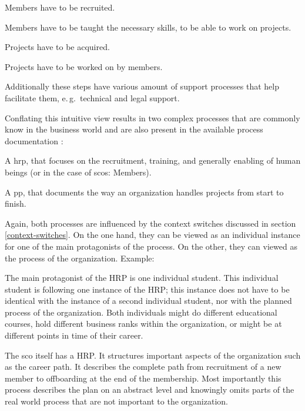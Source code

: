 \documentclass[a4paper, DIV=13, BCOR=0cm]{scrbook}
\newcommand{\eg}{e.\,g.\ }
\begin{document}
\begin{compactitem}
	\item Members have to be recruited.
	\item Members have to be taught the necessary skills, to be able to work on projects.
	\item Projects have to be acquired.
	\item Projects have to be worked on by members.
\end{compactitem}

Additionally these steps have various amount of support processes that help facilitate them, \eg technical and legal support.

Conflating this intuitive view results in two complex processes that are commonly know in the business world \cite{CN} and are also present in the available process documentation \cite{HCPD}:
\begin{compactenum}
	\item A \gls{hrp}, that focuses on the recruitment, training, and generally enabling of human beings (or in the case of \glspl{sco}: Members).
	\item A \gls{pp}, that documents the way an organization handles projects from start to finish.
\end{compactenum}

Again, both processes are influenced by the context switches discussed in section \ref{context-switches}. On the one hand, they can be viewed as an individual instance for one of the main protagonists of the process. On the other, they can viewed as the process of the organization. Example:
\begin{compactitem}
	\item The main protagonist of the HRP is one individual student. This individual student is following one instance of the HRP; this instance does not have to be identical with the instance of a second individual student, nor with the planned process of the organization. Both individuals might do different educational courses, hold different business ranks within the organization, or might be at different points in time of their career.
	\item The \gls{sco} itself has a HRP. It structures important aspects of the organization such as the career path. It describes the complete path from recruitment of a new member to offboarding at the end of the membership. Most importantly this process describes the plan on an abstract level and knowingly omits parts of the real world process that are not important to the organization.
\end{compactitem}
\end{document}
